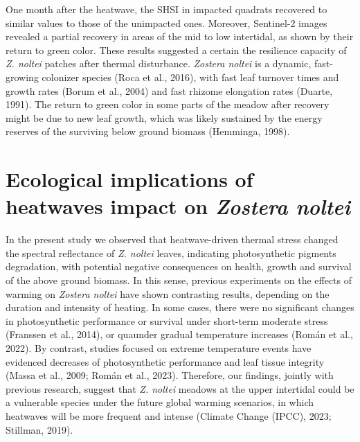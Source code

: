 \documentclass[
  letterpaper,
  DIV=11,
  numbers=noendperiod]{scrartcl}
\begin{document}
One month after the heatwave, the SHSI in impacted quadrats recovered to
similar values to those of the unimpacted ones. Moreover, Sentinel-2
images revealed a partial recovery in areas of the mid to low
intertidal, as shown by their return to green color. These results
suggested a certain the resilience capacity of \emph{Z. noltei} patches
after thermal disturbance. \emph{Zostera noltei} is a dynamic,
fast-growing colonizer species (Roca et al., 2016), with fast leaf
turnover times and growth rates (Borum et al., 2004) and fast rhizome
elongation rates (Duarte, 1991). The return to green color in some parts
of the meadow after recovery might be due to new leaf growth, which was
likely sustained by the energy reserves of the surviving below ground
biomass (Hemminga, 1998).

\section{\texorpdfstring{Ecological implications of heatwaves impact on
\emph{Zostera
noltei}}{Ecological implications of heatwaves impact on Zostera noltei}}\label{ecological-implications-of-heatwaves-impact-on-zostera-noltei}

In the present study we observed that heatwave-driven thermal stress
changed the spectral reflectance of \emph{Z. noltei} leaves, indicating
photosynthetic pigments degradation, with potential negative
consequences on health, growth and survival of the above ground biomass.
In this sense, previous experiments on the effects of warming on
\emph{Zostera noltei} have shown contrasting results, depending on the
duration and intensity of heating. In some cases, there were no
significant changes in photosynthetic performance or survival under
short-term moderate stress (Franssen et al., 2014), or quaunder gradual
temperature increases (Román et al., 2022). By contrast, studies focused
on extreme temperature events have evidenced decreases of photosynthetic
performance and leaf tissue integrity (Massa et al., 2009; Román et al.,
2023). Therefore, our findings, jointly with previous research, suggest
that \emph{Z. noltei} meadows at the upper intertidal could be a
vulnerable species under the future global warming scenarios, in which
heatwaves will be more frequent and intense (Climate Change (IPCC),
2023; Stillman, 2019).
\end{document}
